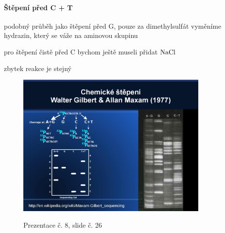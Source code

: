 \documentclass[DIV=8]{scrreprt}
\begin{document}
\paragraph{Štěpení před C + T}
\begin{myItemize}[nosep]
    \item podobný průběh jako štěpení před G, pouze za dimethylsulfát vyměníme hydrazin, který se váže na aminovou skupinu
\begin{myItemize}[nosep]
    \item pro štěpení čistě před C bychom ještě museli přidat \(\ce{NaCl}\)
\end{myItemize}

    \item zbytek reakce je stejný
\end{myItemize}




\begin{figure}
    \caption{Prezentace č. 8, slide č. 26}
    \includegraphics[width=0.85\textwidth]{slides-8/slide-26.jpg}
    \centering
    \label{slides-8-slide-26}
\end{figure}
\end{document}
